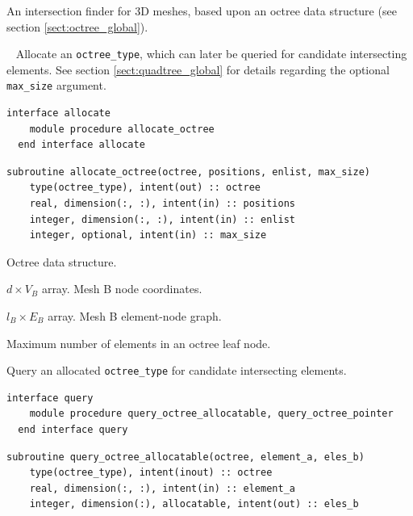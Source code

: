 \documentclass{article}
\begin{document}
An intersection finder for 3D meshes, based upon an octree data structure (see
section \ref{sect:octree_global}).

~\newline
Allocate an \verb+octree_type+, which can later be queried for candidate
intersecting elements. See section \ref{sect:quadtree_global} for details
regarding the optional \verb+max_size+ argument.

\begin{lstlisting}[language=FORTRAN]
  interface allocate
    module procedure allocate_octree
  end interface allocate
\end{lstlisting}
  
\begin{lstlisting}[language=FORTRAN]
  subroutine allocate_octree(octree, positions, enlist, max_size)
    type(octree_type), intent(out) :: octree
    real, dimension(:, :), intent(in) :: positions
    integer, dimension(:, :), intent(in) :: enlist
    integer, optional, intent(in) :: max_size 
\end{lstlisting}

\begin{description}[font=\ttfamily\bfseries,leftmargin=2.2\parindent,labelindent=1.7\parindent,noitemsep]
  \item[octree] Octree data structure.
  \item[positions] $d \times V_B$ array. Mesh B node coordinates.
  \item[enlist] $l_B \times E_B$ array. Mesh B element-node graph.
  \item[max\_size] Maximum number of elements in an octree leaf node.
\end{description}

\noindent Query an allocated \verb+octree_type+ for candidate intersecting
elements.
  
\begin{lstlisting}[language=FORTRAN]
  interface query
    module procedure query_octree_allocatable, query_octree_pointer
  end interface query
\end{lstlisting}
    
\begin{lstlisting}[language=FORTRAN]
  subroutine query_octree_allocatable(octree, element_a, eles_b)
    type(octree_type), intent(inout) :: octree
    real, dimension(:, :), intent(in) :: element_a
    integer, dimension(:), allocatable, intent(out) :: eles_b
\end{lstlisting}
  
\end{document}
